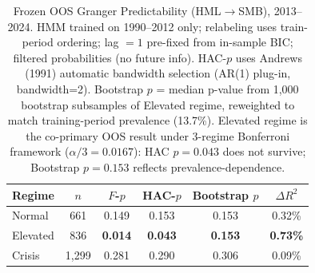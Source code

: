 \documentclass[sigconf,anonymous]{acmart}
\begin{document}
\begin{table}[t]
\centering
\setlength{\tabcolsep}{5pt}
\caption{Frozen OOS Granger Predictability (HML$\to$SMB), 2013--2024.
HMM trained on 1990--2012 only; relabeling uses train-period ordering;
lag $= 1$ pre-fixed from in-sample BIC; filtered probabilities (no future info).
HAC-$p$ uses Andrews (1991) automatic bandwidth selection (AR(1) plug-in, bandwidth=2).
Bootstrap $p$ = median p-value from 1,000 bootstrap subsamples of Elevated regime,
reweighted to match training-period prevalence (13.7\%). Elevated regime is the co-primary
OOS result under 3-regime Bonferroni framework ($\alpha/3 = 0.0167$): HAC $p = 0.043$ does not
survive; Bootstrap $p = 0.153$ reflects prevalence-dependence.}
\label{tab:frozen_granger}
\small
\begin{tabular}{@{}lccccc@{}}
\toprule
Regime & $n$ & $F$-$p$ & HAC-$p$ & Bootstrap $p$ & $\Delta R^2$ \\
\midrule
Normal    & 661 & 0.149 & 0.153 & 0.153 & 0.32\% \\
Elevated  & 836 & \textbf{0.014} & \textbf{0.043} & \textbf{0.153} & \textbf{0.73\%} \\
Crisis    & 1,299 & 0.281 & 0.290 & 0.306 & 0.09\% \\
\bottomrule
\end{tabular}
\end{table}
\end{document}
